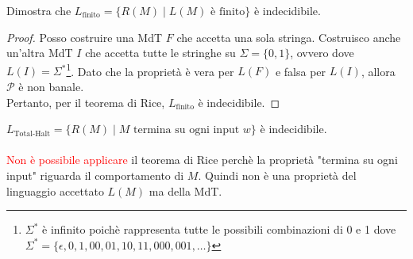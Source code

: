 \documentclass{article}  %
\theoremstyle{definition}
\begin{document}
\begin{esercizio}
	Dimostra che $L_{\text{finito}} = \{ R(M) \mid L(M) \text{ è finito} \}$ è indecidibile.
	\footnotesize
	\begin{proof}
		Posso costruire una MdT $F$ che accetta una sola stringa. Costruisco anche un'altra MdT $I$ che accetta tutte le stringhe su $\Sigma=\{0,1\}$,
		ovvero dove $L(I)=\Sigma^*$\footnote{$\Sigma^*$ è infinito poichè rappresenta tutte le possibili combinazioni di 0 e 1 dove \\
			$\Sigma^*=\{\epsilon,0,1,00,01,10,11,000,001, \dots\}$}. Dato che la proprietà è vera per $L(F)$ e falsa per $L(I)$, allora
		$\mathscr{P}$ è non banale. \\ Pertanto, per il teorema di Rice, $L_{\text{finito}}$ è indecidibile.
	\end{proof}
\end{esercizio}
\begin{esercizio}
	$L_{\text{Total-Halt}} = \{ R(M) \mid M \text{ termina su ogni input } w\}$ è indecidibile.
	\footnotesize \\ \\
	\textcolor{red}{Non è possibile applicare} il teorema di Rice perchè la proprietà "termina su ogni input" riguarda il comportamento
	di $M$. Quindi non è una proprietà del linguaggio accettato $L(M)$ ma della MdT.
\end{esercizio}
\break
\end{document}
